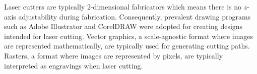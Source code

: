 Laser cutters are typically 2-dimensional fabricators which means there is no $z$-axis adjustability during fabrication. Consequently, prevalent drawing programs such as Adobe Illustrator and CorelDRAW were adopted for creating designs intended for laser cutting. Vector graphics, a scale-agnostic format where images are represented mathematically, are typically used for generating cutting paths. Rasters, a format where images are represented by pixels, are typically interpreted as engravings when laser cutting.